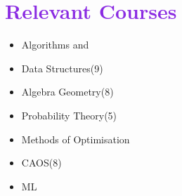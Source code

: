 \documentclass[letterpaper,11pt]{article}
\makeatletter
\newcommand{\resumeItem}[1]{
  \item\small{
    {#1 \vspace{-2pt}}
  }
}
\newcommand{\resumeSubheading}[4]{
  \vspace{-2pt}\item
    \begin{tabular*}{1.0\textwidth}[t]{l@{\extracolsep{\fill}}r}
      \textbf{#1} & \textbf{\small #2} \\
      \textit{\small#3} & \textit{\small #4} \\
    \end{tabular*}\vspace{-7pt}
}
\newcommand{\resumeSubHeadingListStart}{\begin{itemize}[leftmargin=0.0in, label={}]}
\newcommand{\resumeSubHeadingListEnd}{\end{itemize}}
\newcommand{\resumeItemListStart}{\begin{itemize}}
\newcommand{\resumeItemListEnd}{\end{itemize}\vspace{-5pt}}
\makeatother
\begin{document}
\section{\textcolor{BlueViolet}{Relevant Courses}}
        \begin{multicols}{4}
            \begin{itemize}[itemsep=-5pt, parsep=3pt]
                \item Algorithms and
                \item[] Data Structures(9)
                \item Algebra Geometry(8)
                \item Probability Theory(5)
                \item Methods of Optimisation
                \item CAOS(8)
                \item ML
                
            \end{itemize}
        \end{multicols}
        \vspace*{2.0\multicolsep}



\end{document}
